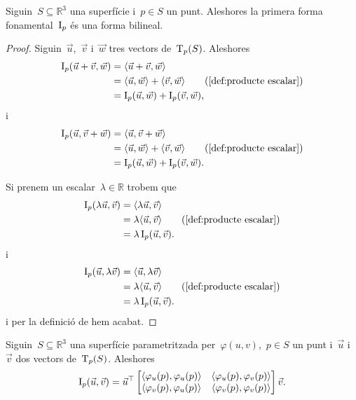 \documentclass[../../main.tex]{subfiles}
\begin{document}
    \begin{proposition}
        \label{prop:la primera forma fonamental és una forma bilineal}
        Siguin~\(S\subseteq\mathbb{R}^{3}\) una superfície i~\(p\in S\) un punt.
        Aleshores la primera forma fonamental~\(\I_{p}\) és una forma bilineal.
    \end{proposition}
    \begin{proof}
        Siguin~\(\vec{u}\),~\(\vec{v}\) i~\(\vec{w}\) tres vectors de~\(\operatorname{T}_{p}(S)\).
        Aleshores
        \begin{align*}
            \I_{p}(\vec{u}+\vec{v},\vec{w})&=\prodesc{\vec{u}+\vec{v}}{\vec{w}} \\
            &=\prodesc{\vec{u}}{\vec{w}}+\prodesc{\vec{v}}{\vec{w}} \tag{\ref{def:producte escalar}}\\
            &=\I_{p}(\vec{u},\vec{w})+\I_{p}(\vec{v},\vec{w}),
        \end{align*}
        i
        \begin{align*}
            \I_{p}(\vec{u},\vec{v}+\vec{w})&=\prodesc{\vec{u}}{\vec{v}+\vec{w}} \\
            &=\prodesc{\vec{u}}{\vec{w}}+\prodesc{\vec{v}}{\vec{w}} \tag{\ref{def:producte escalar}}\\
            &=\I_{p}(\vec{u},\vec{w})+\I_{p}(\vec{v},\vec{w}).
        \end{align*}

        Si prenem un escalar~\(\lambda\in\mathbb{R}\) trobem que
        \begin{align*}
            \I_{p}(\lambda\vec{u},\vec{v})&=\prodesc{\lambda\vec{u}}{\vec{v}} \\
            &=\lambda\prodesc{\vec{u}}{\vec{v}} \tag{\ref{def:producte escalar}}\\
            &=\lambda\I_{p}(\vec{u},\vec{v}).
        \end{align*}
        i
        \begin{align*}
            \I_{p}(\vec{u},\lambda\vec{v})&=\prodesc{\vec{u}}{\lambda\vec{v}} \\
            &=\lambda\prodesc{\vec{u}}{\vec{v}} \tag{\ref{def:producte escalar}}\\
            &=\lambda\I_{p}(\vec{u},\vec{v}).
        \end{align*}
        i per la definició de  hem acabat.
    \end{proof}
    \begin{proposition}
        \label{prop:coeficients de la primera forma fonamental}
        Siguin~\(S\subseteq\mathbb{R}^{3}\) una superfície parametritzada per~\(\varphi(u,v)\),~\(p\in S\) un punt i~\(\vec{u}\) i~\(\vec{v}\) dos vectors de~\(\operatorname{T}_{p}(S)\).
        Aleshores
        \[\I_{p}(\vec{u},\vec{v})=\vec{u}^{\transposta}\begin{bmatrix}
            \prodesc{\varphi_{u}(p)}{\varphi_{u}(p)} & \prodesc{\varphi_{u}(p)}{\varphi_{v}(p)} \\
            \prodesc{\varphi_{v}(p)}{\varphi_{u}(p)} & \prodesc{\varphi_{v}(p)}{\varphi_{v}(p)}
        \end{bmatrix}\vec{v}.\]
    \end{proposition}
\end{document}
